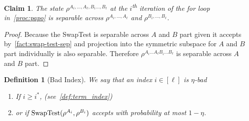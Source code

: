 \documentclass[10pt,a4paper]{article}
\newtheorem{definition}[theorem]{Definition}
\newtheorem{lemma}[theorem]{Lemma}
\newtheorem{claim}[theorem]{Claim}
\theoremstyle{remark}
\def\eps{\varepsilon}
\def\epsilon{\varepsilon}
\def\eps{\epsilon}
\newcommand{\1}[1]{\mathds{1}{[#1]}}
\numberwithin{equation}{section}
\begin{document}

\begin{claim}\label{claim:rho-separable}
  The state $\rho^{A_i,\ldots,A_ \ell, B_i\ldots, B_\ell}$ at the $i$\textsuperscript{th} iteration of the for loop in~\cref{proc:papo} is separable across $\rho^{A_i,\ldots, A_\ell}$ and $ \rho^{B_i,\ldots,B_\ell}$.
\end{claim}
\begin{proof}
Because the SwapTest is separable across $A$ and $B$ part given it accepts by~\cref{fact:swap-test-sep} and projection into the symmetric subspace for $A$ and $B$ part individually is also separable. 
Therefore $\rho^{A_i\ldots A_\ell B_i\ldots B_\ell}$ is separable across $A$ and $B$ part.
\end{proof}

\begin{definition}[Bad Index]
We say that an index $i \in [\ell]$ is $\eta$-\emph{bad}
\begin{enumerate}
    \item If $i \ge i^*$, (see~\cref{def:term_index})
    \item or if $\textup{SwapTest}(\rho^{A_i}, \rho^{B_i})$ accepts with probability at most $1-\eta$.
\end{enumerate}
\end{definition}

\end{document}
